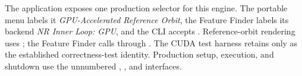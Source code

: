 The application exposes one production selector for this engine.  The portable
menu labels it \emph{GPU-Accelerated Reference Orbit}, the Feature Finder labels
its backend \emph{NR Inner Loop: GPU}, and the CLI accepts .
Reference-orbit rendering uses ; the Feature Finder calls
 through
.  The CUDA test harness retains
 only as the established correctness-test
identity.  Production setup, execution, and shutdown use the unnumbered
,
, and
 interfaces.
